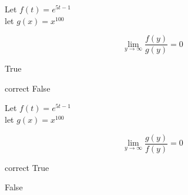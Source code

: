 \documentclass{ximera}
\author{Lee Wayand}
\begin{document}
\begin{exercise}




\begin{question}


Let $f(t) = e^{5t-1}$ \\

let $g(x) = x^{100}$



\[
\lim\limits_{y \to \infty}\frac{f(y)}{g(y)} = 0
\]


\begin{multipleChoice}
\item {True}
\item [correct]{False}
\end{multipleChoice}


\end{question}







\begin{question}


Let $f(t) = e^{5t-1}$ \\

let $g(x) = x^{100}$



\[
\lim\limits_{y \to \infty}\frac{g(y)}{f(y)} = 0
\]


\begin{multipleChoice}
\item [correct]{True}
\item {False}
\end{multipleChoice}


\end{question}









\end{exercise}
\end{document}
